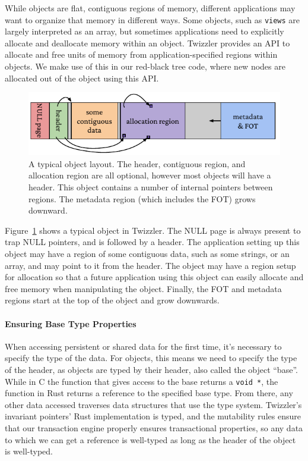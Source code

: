 While objects are flat, contiguous regions of memory, different applications may want to organize
that memory in different ways. Some objects, such as \texttt{views} are largely interpreted as an
array, but sometimes applications need to explicitly allocate and deallocate memory within an object.
Twizzler provides an API to allocate and free units of memory from application-specified regions
within objects. We make use of this in our red-black tree code, where new nodes are allocated out of
the object using this API.

\begin{figure}
    \centering
    \includegraphics[width=\linewidth]{fig/typobj}
    \caption[Typical object layout]{A typical object layout. The header, contiguous region, and allocation region are all
        optional, however most objects will have a header. This object contains a number of internal
        pointers between regions. The metadata region (which includes the FOT) grows downward.}
    \label{fig:typobj}
\end{figure}

Figure~\ref{fig:typobj} shows a typical object in Twizzler. The NULL page is always present to trap
NULL pointers, and is followed by a header. The application setting up this object may have a region
of some contiguous data, such as some strings, or an array, and may point to it from the header.
The object may have a region setup for allocation so that a future application using this
object can easily allocate and free memory when manipulating the object. Finally, the FOT and
metadata regions start at the top of the object and grow downwards.

\paragraph{Ensuring Base Type Properties}

When accessing persistent or shared data for the first time, it's necessary to specify the type of the data. For
objects, this means we need to specify the type of the header, as objects are typed by their header, also called the
object ``base''. While in C the function that gives access to the base returns a \texttt{void *}, the function in Rust
returns a reference to the specified base type. From there, any other data accessed traverses data structures that use
the type system. Twizzler's invariant pointers' Rust implementation is typed, and the mutability rules ensure that our
transaction engine properly ensures transactional properties, so any data to which we can get a reference is
well-typed as long as the header of the object is well-typed.

